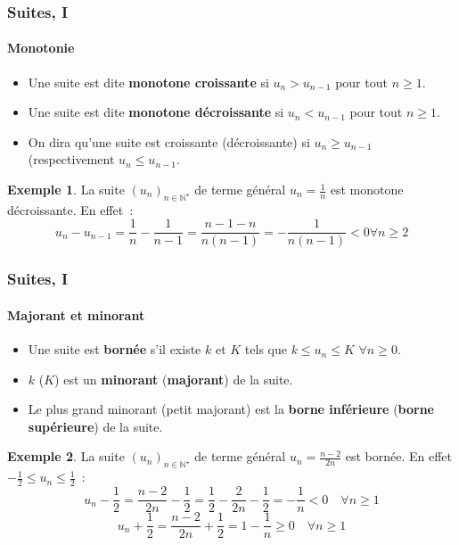 \documentclass[10pt,notheorems]{beamer}
\theoremstyle{plain}
\theoremstyle{definition} %
\newtheorem{example}{Exemple}
\begin{document}
\begin{frame}
  \frametitle{Suites, I}
  \framesubtitle{Monotonie}
  \hypertarget{slide_suites_3}{}

  \begin{itemize}

  \item Une suite est dite \textbf{monotone croissante} si $u_n>u_{n-1}$ pour tout $n\geq 1$.\newline

  \item Une suite est dite \textbf{monotone décroissante} si $u_n<u_{n-1}$ pour tout $n\geq 1$.\newline

  \item On dira qu'une suite est croissante (décroissante) si $u_n\geq u_{n-1}$ (respectivement $u_n\leq u_{n-1}$.\newline

  \end{itemize}

  \begin{example}
    La suite $(u_n)_{n\in\mathbb N^{\star}}$ de terme général $u_n = \frac{1}{n}$ est monotone décroissante. En effet~:
    \[
      u_n - u_{n-1} = \frac{1}{n}-\frac{1}{n-1} = \frac{n-1-n}{n(n-1)} = -\frac{1}{n(n-1)}<0 \forall n\geq 2
    \]
  \end{example}

\end{frame}


\begin{frame}
  \frametitle{Suites, I}
  \framesubtitle{Majorant et minorant}
  \hypertarget{slide_suites_4}{}

  \begin{itemize}

  \item Une suite est \textbf{bornée} s'il existe $k$ et $K$ tels que $k\leq u_n\leq K$ $\forall n\geq 0$.\newline

  \item $k$ ($K$) est un \textbf{minorant} (\textbf{majorant}) de la suite.\newline

  \item Le plus grand minorant (petit majorant) est la \textbf{borne inférieure} (\textbf{borne supérieure}) de la suite.\newline

  \end{itemize}

  \begin{example}
    La suite $(u_n)_{n\in\mathbb N^{\star}}$ de terme général $u_n = \frac{n-2}{2n}$ est bornée. En effet $-\frac{1}{2}\leq u_n\leq \frac{1}{2}$~:
    \[
      u_n - \frac{1}{2} =  \frac{n-2}{2n}-\frac{1}{2}=\frac{1}{2}-\frac{2}{2n}-\frac{1}{2}=-\frac{1}{n}<0 \quad\forall n\geq 1
    \]
    \[
      u_n+\frac{1}{2} = \frac{n-2}{2n}+\frac{1}{2} = 1 - \frac{1}{n} \geq 0\quad \forall n\geq 1
    \]
  \end{example}

\end{frame}
\end{document}
